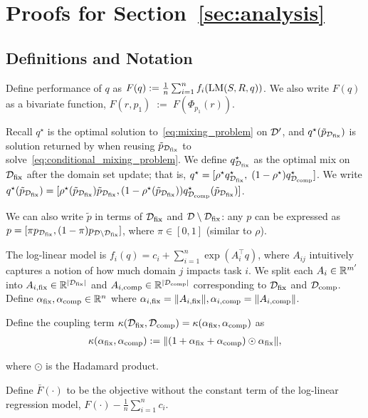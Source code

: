 \section{Proofs for Section~\ref{sec:analysis}}\label{supp:proofs}

\subsection{Definitions and Notation}\label{supp:defs}
Define performance of $q$ as $F(q) := \frac{1}{n}\sum_{i=1}^n f_i(\text{LM}(S,R,q))$. We also write $F(q)$ as a bivariate function, $F(r,p_1) \;:=\; F(\Phi_{p_1}(r))$. 

Recall $q^\star$ is the optimal solution to~\eqref{eq:mixing_problem} on $\mathcal{D}'$, and $q^\star(\tilde p_{\mathcal{D}_{\text{fix}}})$ is solution returned by \fullmixreuse when reusing $\tilde p_{\mathcal{D}_{\text{fix}}}$ to solve~\eqref{eq:conditional_mixing_problem}. We define $q^\star_{\mathcal{D}_{\text{fix}}}$ as the optimal mix on $\mathcal{D}_{\text{fix}}$ after the domain set update; that is, $q^\star = [\rho^\star q^\star_{\mathcal{D}_{\text{fix}}},\; (1-\rho^\star)q^\star_{\mathcal{D}_{\text{comp}}}]$. We write $q^\star(\tilde p_{\mathcal{D}_{\text{fix}}}) = [\rho^\star(\tilde p_{\mathcal{D}_{\text{fix}}}) \tilde p_{\mathcal{D}_{\text{fix}}}, (1 - \rho^\star(\tilde p_{\mathcal{D}_{\text{fix}}})) q_{\mathcal{D}_{\text{comp}}}^\star(\tilde p_{\mathcal{D}_{\text{fix}}})]$.

We can also write $\tilde{p}$ in terms of $\mathcal{D}_{\text{fix}}$ and $\mathcal{D} \setminus \mathcal{D}_{\text{fix}}$: any $p$ can be expressed as $p = [\pi p_{\mathcal{D}_{\text{fix}}}, (1 - \pi) p_{\mathcal{D} \setminus \mathcal{D}_{\text{fix}}}]$, where $\pi \in [0, 1]$ (similar to $\rho$).



The log-linear model is $f_i(q) = c_i + \sum_{i = 1}^n \exp(A_i^\top q)$, where $A_{ij}$ intuitively captures a notion of how much domain $j$ impacts task $i$. We split each $A_i \in \mathbb{R}^{m'}$ into $A_{i, \text{fix}} \in \mathbb{R}^{|\mathcal{D}_{\text{fix}}|}$ and $A_{i,\text{comp}} \in \mathbb{R}^{|\mathcal{D}_{\text{comp}}|}$ corresponding to $\mathcal{D}_{\text{fix}}$ and $\mathcal{D}_{\text{comp}}$. Define $\alpha_{\text{fix}}, \alpha_{\text{comp}} \in \mathbb{R}^n$ where $\alpha_{i, \text{fix}} = \|A_{i, \text{fix}}\|, \alpha_{i, \text{comp}} = \|A_{i, \text{comp}} \|$. 

Define the coupling term $\kappa(\mathcal{D}_{\text{fix}}, \mathcal{D}_{\text{comp}}) = \kappa(\alpha_{\text{fix}}, \alpha_{\text{comp}})$ as
\begin{align}
    \kappa(\alpha_{\text{fix}}, \alpha_{\text{comp}}) := \|(1 + \alpha_{\text{fix}} + \alpha_{\text{comp}}) \odot \alpha_{\text{fix}} \|,
\end{align}

where $\odot$ is the Hadamard product.

Define $\bar{F}(\cdot)$ to be the objective without the constant term of the log-linear regression model, $F(\cdot) - \frac{1}{n}\sum_{i =1 }^n c_i$.



